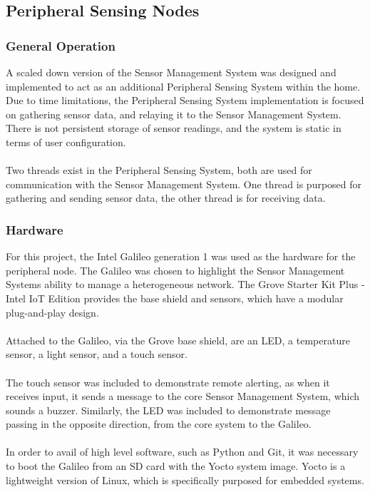 \documentclass{article}
\begin{document}
\newpage
\subsection{Peripheral Sensing Nodes}
\subsubsection{General Operation}
A scaled down version of the Sensor Management System was designed and implemented to act as an additional Peripheral Sensing System within the home. Due to time limitations, the Peripheral Sensing System implementation is focused on gathering sensor data, and relaying it to the Sensor Management System. There is not persistent storage of sensor readings, and the system is static in terms of user configuration. \\\\
Two threads exist in the Peripheral Sensing System, both are used for communication with the Sensor Management System. One thread is purposed for gathering and sending sensor data, the other thread is for receiving data. 

\subsubsection{Hardware}
For this project, the Intel Galileo generation 1 was used as the hardware for the peripheral node. The Galileo was chosen to highlight the Sensor Management Systems ability to manage a heterogeneous network. The Grove Starter Kit Plus - Intel IoT Edition provides the base shield and sensors, which have a modular plug-and-play design.  \\\\
Attached to the Galileo, via the Grove base shield, are an LED, a temperature sensor, a light sensor, and a touch sensor.\\\\
The touch sensor was included to demonstrate remote alerting, as when it receives input, it sends a message to the core Sensor Management System, which sounds a buzzer. Similarly, the LED was included to demonstrate message passing in the opposite direction, from the core system to the Galileo. \\\\
In order to avail of high level software, such as Python and Git, it was necessary to boot the Galileo from an SD card with the Yocto system image. Yocto is a lightweight version of Linux, which is specifically purposed for embedded systems. 
\end{document}
